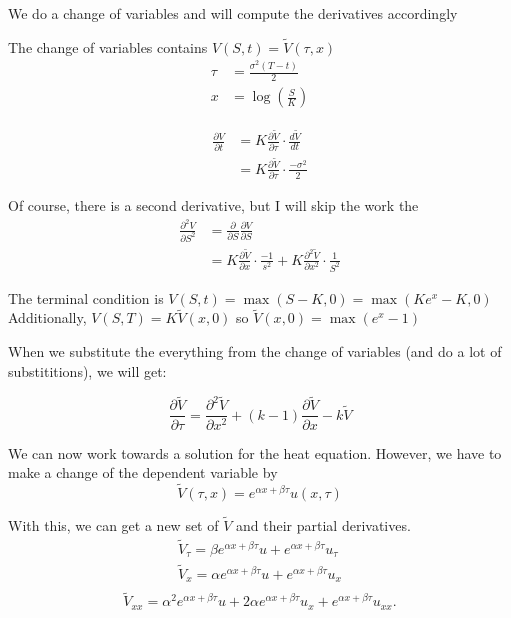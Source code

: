 \documentclass{article}
\begin{document}



We do a change of variables and will compute the derivatives accordingly



The change of variables contains $V(S,t) = \tilde{V}(\tau, x)$
\begin{align}
    \tau &= \frac{\sigma^2(T-t)}{2} \\
    x &= \log{(\frac{S}{K})}
\end{align}


\begin{align*}
    \frac{\partial V}{\partial t} &= K\frac{\partial \tilde{V}}{\partial \tau}
    \cdot \frac{d\tilde{V}}{dt} \\
    &= K\frac{\partial \tilde{V}}{\partial \tau} \cdot \frac{-\sigma^2}{2}
\end{align*}

Of course, there is a second derivative, but I will skip the work the 
\begin{align*}
    \frac{\partial^2 V}{\partial S^2} &= \frac{\partial }{\partial S} \frac{\partial V}{\partial S} \\
    &= K \frac{\partial \tilde{V}}{\partial x} \cdot \frac{-1}{s^2} + K \frac{\partial^2 \tilde{V}}{\partial x^2} \cdot \frac{1}{S^2}
\end{align*}

The terminal condition is $V(S,t) = \max{(S-K, 0) = \max{(Ke^x - K, 0)}}$
Additionally, 
$V(S,T) = K\tilde{V}(x,0)$ so $\tilde{V}(x,0) = \max{(e^x -1)}$

When we substitute the everything from the change of variables (and do a lot of substititions), we will get:

\begin{equation}
    \frac{\partial \tilde{V}}{\partial \tau} = \frac{\partial^2 \tilde{V}}{\partial x^2} + (k-1)\frac{\partial \tilde{V}}{\partial x} - k\tilde{V}
\end{equation}

We can now work towards a solution for the heat equation. However, we have to make a change of the dependent variable by
\begin{equation}
    \tilde{V}(\tau, x) = e^{\alpha x + \beta \tau} u(x,\tau)
\end{equation}

With this, we can get a new set of $\tilde{V}$ and their partial derivatives.
\begin{align}
    \tilde{V}_{\tau} = \beta e^{\alpha x + \beta \tau} u + e^{\alpha x + \beta \tau} u_{\tau} \\
    \tilde{V}_{x} = \alpha e^{\alpha x + \beta \tau} u + e^{\alpha x + \beta \tau} u_{x} \\
\end{align}
\begin{equation}
    \tilde{V}_{xx} = \alpha^2 e^{\alpha x + \beta \tau} u + 2\alpha e^{\alpha x + \beta \tau} u_{x} + e^{\alpha x + \beta \tau} u_{xx}. 
\end{equation}
\end{document}
